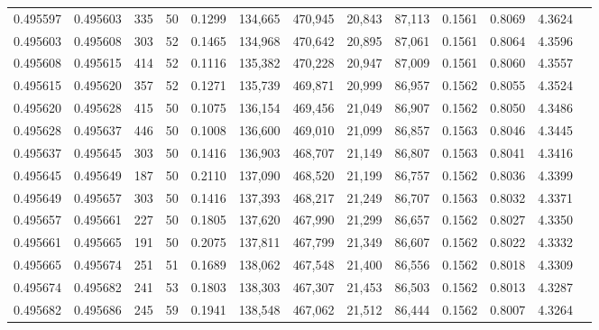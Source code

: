 \begin{tabular}{rrrrrrrrrrrrr}
0.495597 & 0.495603 & 335 &  50 &                                     0.1299 & 134,665 & 470,945 &  20,843 &  87,113 & 0.1561 & 0.8069 & 4.3624 \\
0.495603 & 0.495608 & 303 &  52 &                                     0.1465 & 134,968 & 470,642 &  20,895 &  87,061 & 0.1561 & 0.8064 & 4.3596 \\
0.495608 & 0.495615 & 414 &  52 &                                     0.1116 & 135,382 & 470,228 &  20,947 &  87,009 & 0.1561 & 0.8060 & 4.3557 \\
0.495615 & 0.495620 & 357 &  52 &                                     0.1271 & 135,739 & 469,871 &  20,999 &  86,957 & 0.1562 & 0.8055 & 4.3524 \\
0.495620 & 0.495628 & 415 &  50 &                                     0.1075 & 136,154 & 469,456 &  21,049 &  86,907 & 0.1562 & 0.8050 & 4.3486 \\
0.495628 & 0.495637 & 446 &  50 &                                     0.1008 & 136,600 & 469,010 &  21,099 &  86,857 & 0.1563 & 0.8046 & 4.3445 \\
0.495637 & 0.495645 & 303 &  50 &                                     0.1416 & 136,903 & 468,707 &  21,149 &  86,807 & 0.1563 & 0.8041 & 4.3416 \\
0.495645 & 0.495649 & 187 &  50 &                                     0.2110 & 137,090 & 468,520 &  21,199 &  86,757 & 0.1562 & 0.8036 & 4.3399 \\
0.495649 & 0.495657 & 303 &  50 &                                     0.1416 & 137,393 & 468,217 &  21,249 &  86,707 & 0.1563 & 0.8032 & 4.3371 \\
0.495657 & 0.495661 & 227 &  50 &                                     0.1805 & 137,620 & 467,990 &  21,299 &  86,657 & 0.1562 & 0.8027 & 4.3350 \\
0.495661 & 0.495665 & 191 &  50 &                                     0.2075 & 137,811 & 467,799 &  21,349 &  86,607 & 0.1562 & 0.8022 & 4.3332 \\
0.495665 & 0.495674 & 251 &  51 &                                     0.1689 & 138,062 & 467,548 &  21,400 &  86,556 & 0.1562 & 0.8018 & 4.3309 \\
0.495674 & 0.495682 & 241 &  53 &                                     0.1803 & 138,303 & 467,307 &  21,453 &  86,503 & 0.1562 & 0.8013 & 4.3287 \\
0.495682 & 0.495686 & 245 &  59 &                                     0.1941 & 138,548 & 467,062 &  21,512 &  86,444 & 0.1562 & 0.8007 & 4.3264 \\

\end{tabular}
